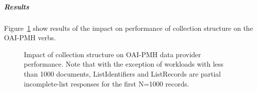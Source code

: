 \subparagraph{Results}

Figure~\ref{fig:experimentation:performance:oaipmh:level} show results of the impact on performance of collection structure on the OAI-PMH verbs.

% 
\begin{comment}
\tablespacing

\bodyspacing
\end{comment}

\begin{figure}
 \centering
 \framebox[\textwidth]{%

 }
 \caption[Impact of collection structure on OAI-PMH]{Impact of collection structure on OAI-PMH data provider performance. Note that with the exception of workloads with less than \num{1000} documents, ListIdentifiers and ListRecords are partial incomplete-list responses for the first N=\num{1000} records.}
 \label{fig:experimentation:performance:oaipmh:level}
\end{figure}
% 

